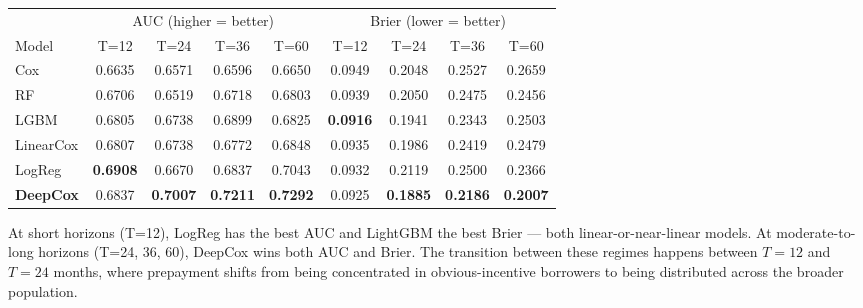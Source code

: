 \documentclass[11pt,a4paper]{article}
\begin{document}
\begin{center}
  \small
  \begin{tabular}{lcccc|cccc}
    \toprule
                     & \multicolumn{4}{c|}{AUC (higher = better)} & \multicolumn{4}{c}{Brier (lower = better)}                                                                                                             \\
    Model            & T=12                                       & T=24                                       & T=36            & T=60            & T=12            & T=24            & T=36            & T=60            \\
    \midrule
    Cox              & 0.6635                                     & 0.6571                                     & 0.6596          & 0.6650          & 0.0949          & 0.2048          & 0.2527          & 0.2659          \\
    RF               & 0.6706                                     & 0.6519                                     & 0.6718          & 0.6803          & 0.0939          & 0.2050          & 0.2475          & 0.2456          \\
    LGBM             & 0.6805                                     & 0.6738                                     & 0.6899          & 0.6825          & \textbf{0.0916} & 0.1941          & 0.2343          & 0.2503          \\
    LinearCox        & 0.6807                                     & 0.6738                                     & 0.6772          & 0.6848          & 0.0935          & 0.1986          & 0.2419          & 0.2479          \\
    LogReg           & \textbf{0.6908}                            & 0.6670                                     & 0.6837          & 0.7043          & 0.0932          & 0.2119          & 0.2500          & 0.2366          \\
    \textbf{DeepCox} & 0.6837                                     & \textbf{0.7007}                            & \textbf{0.7211} & \textbf{0.7292} & 0.0925          & \textbf{0.1885} & \textbf{0.2186} & \textbf{0.2007} \\
    \bottomrule
  \end{tabular}
\end{center}

At short horizons (T=12), LogReg has the best AUC and LightGBM the best Brier --- both linear-or-near-linear models. At moderate-to-long horizons (T=24, 36, 60), DeepCox wins both AUC and Brier. The transition between these regimes happens between $T{=}12$ and $T{=}24$ months, where prepayment shifts from being concentrated in obvious-incentive borrowers to being distributed across the broader population.
\end{document}
